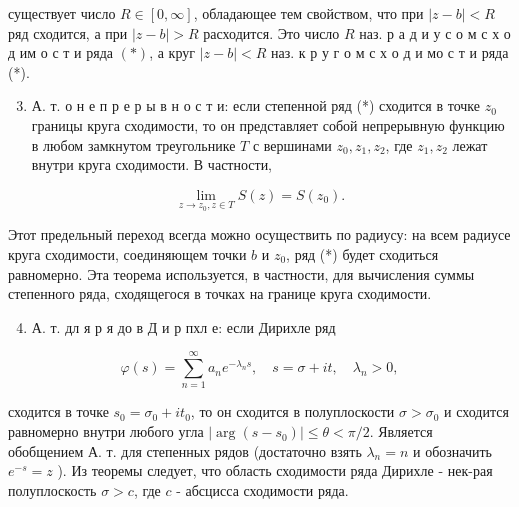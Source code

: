 \documentclass[10pt]{article}
\begin{document}
существует число $R \in[0, \infty]$, обладающее тем свойством, что при $|z-b|<R$ ряд сходится, а при $|z-b|>R$ расходится. Это число $R$ наз. р а д и у с о м с х о д им о с т и ряда $(*)$, а круг $|z-b|<R$ наз. к р у г о м с х о д и мо с т и ряда (*).



\begin{enumerate}

  \setcounter{enumi}{2}

  \item А. т. о н е п р е р ы в н о с т и: если степенной ряд (*) сходится в точке $z_{0}$ границы круга сходимости, то он представляет собой непрерывную функцию в любом замкнутом треугольнике $T$ с вершинами $z_{0}, z_{1}, z_{2}$, где $z_{1}, z_{2}$ лежат внутри круга сходимости. В частности,

\end{enumerate}



\[

\lim _{z \rightarrow z_{0}, z \in T} S(z)=S\left(z_{0}\right) .

\]



Этот предельный переход всегда можно осуществить по радиусу: на всем радиусе круга сходимости, соединяющем точки $b$ и $z_{0}$, ряд (*) будет сходиться равномерно. Эта теорема используется, в частности, для вычисления суммы степенного ряда, сходящегося в точках на границе круга сходимости.



\begin{enumerate}

  \setcounter{enumi}{3}

  \item А. т. дл я р я до в Д и р пхл е: если Дирихле ряд

\end{enumerate}



\[

\varphi(s)=\sum_{n=1}^{\infty} a_{n} e^{-\lambda_{n} s}, \quad s=\sigma+i t, \quad \lambda_{n}>0,

\]



сходится в точке $s_{0}=\sigma_{0}+i t_{0}$, то он сходится в полуплоскости $\sigma>\sigma_{0}$ и сходится равномерно внутри любого угла $\left|\arg \left(s-s_{0}\right)\right| \leqslant \theta<\pi / 2$. Является обобщением А. т. для степенных рядов (достаточно взять $\lambda_{n}=n$ и обозначить $e^{-s}=z$ ). Из теоремы следует, что область сходимости ряда Дирихле - нек-рая полуплоскость $\sigma>c$, где $c$ - абсцисса сходимости ряда.
\end{document}
